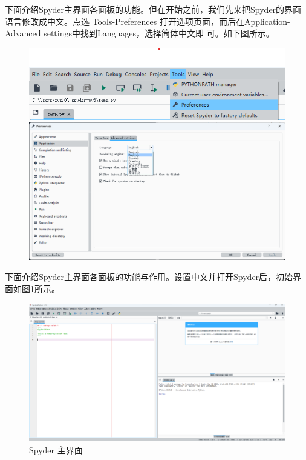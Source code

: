 下面介绍Spyder主界面各面板的功能。但在开始之前，我们先来把Spyder的界面语言修改成中文。点选 
Tools-Preferences 打开选项页面，而后在Application-Advanced settings中找到Languages，选择简体中文即
可。如下图所示。
\begin{figure}[htbp]
    \begin{minipage}[h]{0.3\linewidth}
        \centering
        \includegraphics*[height=0.3\linewidth]{pic/Spyder_Language_1.png}
    \end{minipage}
    \hfill
    \begin{minipage}[h]{0.6\linewidth}
        \centering
        \includegraphics*[height=0.4\linewidth]{pic/Spyder_Language_2.png}
    \end{minipage}
\end{figure}
\newpage
下面介绍Spyder主界面各面板的功能与作用。设置中文并打开Spyder后，初始界面如图\ref{fig:spyderMain}所示。
\begin{figure}[htbp]
    \centering
    \includegraphics[width=0.7\linewidth]{pic/spyder主界面.png}
    \caption{Spyder 主界面}
    \label{fig:spyderMain}
\end{figure}

